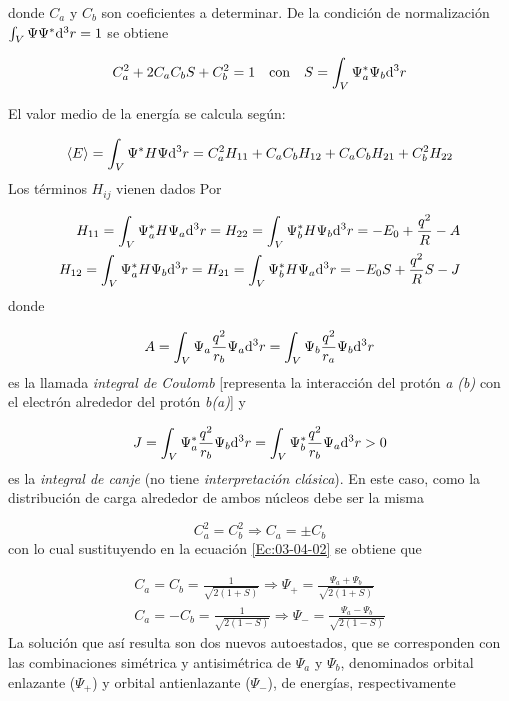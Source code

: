 donde $C_a$ y $C_b$ son coeficientes a determinar. De la condición de normalización $\int_V \Psi \Psi^* \mathrm{d}^3 r = 1$ se obtiene 

\begin{equation}
    C_a^2 + 2 C_a C_b S + C_b^2 = 1 \quad \text{con} \quad S = \int_V \Psi_a^* \Psi_b \mathrm{d}^3 r \label{Ec:03-04-02}
\end{equation}

El valor medio de la energía se calcula según:

\begin{equation}
    \langle E \rangle = \int_V \Psi^* H \Psi \mathrm{d}^3 r = C_a^2 H_{11} + C_a C_b H_{12} + C_a C_b H_{21} + C_b^2 H_{22} \label{Ec:03-04-03}
\end{equation}
Los términos $H_{ij}$ vienen dados Por

\begin{align*}
    H_{11} = \int_V \Psi_a^* H \Psi_a \mathrm{d}^3 r = H_{22} = \int_V \Psi_b^* H \Psi_b \mathrm{d}^3 r = - E_0 + \frac{q^2}{R}-A \\
    H_{12} = \int_V \Psi_a^* H \Psi_b \mathrm{d}^3 r = H_{21} = \int_V \Psi_b^* H \Psi_a \mathrm{d}^3 r = - E_0 S + \frac{q^2}{R}S-J \\
\end{align*}
donde 

\begin{equation*}
    A = \int_V \Psi_a \frac{q^2}{r_b} \Psi_a \mathrm{d}^3 r  = \int_V \Psi_b \frac{q^2}{r_a} \Psi_b \mathrm{d}^3 r
\end{equation*}
es la llamada \textit{integral de Coulomb} [representa la interacción del protón \textit{a (b)} con el electrón alrededor del protón \textit{b(a)}] y

\begin{equation*}
    J = \int_V \Psi_a^* \frac{q^2}{r_b} \Psi_b \mathrm{d}^3 r = \int_V \Psi_b^* \frac{q^2}{r_b} \Psi_a \mathrm{d}^3 r > 0
\end{equation*}
es la \textit{integral de canje} (no tiene \textit{interpretación clásica}). En este caso, como la distribución de carga alrededor de ambos núcleos debe ser la misma

\begin{equation*}
    C_a^2 = C_b^2 \Rightarrow C_a = \pm C_b
\end{equation*}
con lo cual sustituyendo en la ecuación \ref{Ec:03-04-02} se obtiene que

\begin{align}
    C_a = C_b = \frac{1}{\sqrt{2(1+S)}} \Rightarrow \Psi_+ = \frac{\Psi_a+\Psi_b}{\sqrt{2(1+S)}} \\
    C_a = -  C_b = \frac{1}{\sqrt{2(1-S)}} \Rightarrow \Psi_- = \frac{\Psi_a-\Psi_b}{\sqrt{2(1-S)}} 
\end{align}
La solución que así resulta son dos nuevos autoestados, que se corresponden con las combinaciones simétrica y antisimétrica de $\Psi_a$ y $\Psi_b$, denominados orbital enlazante ($\Psi_+$) y orbital antienlazante ($\Psi_-$), de energías, respectivamente 

